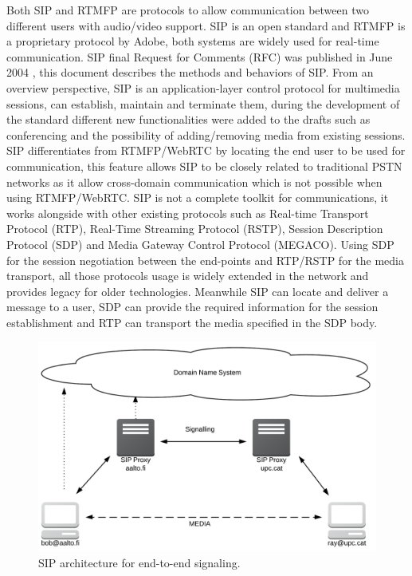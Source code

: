 Both SIP and RTMFP are protocols to allow communication between two different users with audio/video support. SIP is an open standard and RTMFP is a proprietary protocol by Adobe, both systems are widely used for real-time communication. SIP final Request for Comments (RFC) was published in June 2004 \cite{sipRFC}, this document describes the methods and behaviors of SIP. From an overview perspective, SIP is an application-layer control protocol for multimedia sessions, can establish, maintain and terminate them, during the development of the standard different new functionalities were added to the drafts such as conferencing and the possibility of adding/removing media from existing sessions. SIP differentiates from RTMFP/WebRTC by locating the end user to be used for communication, this feature allows SIP to be closely related to traditional PSTN networks as it allow cross-domain communication which is not possible when using RTMFP/WebRTC. SIP is not a complete toolkit for communications, it works alongside with other existing protocols such as Real-time Transport Protocol (RTP), Real-Time Streaming Protocol (RSTP), Session Description Protocol (SDP) and Media Gateway Control Protocol (MEGACO). Using SDP for the session negotiation between the end-points and RTP/RSTP for the media transport, all those protocols usage is widely extended in the network and provides legacy for older technologies. Meanwhile SIP can locate and deliver a message to a user, SDP can provide the required information for the session establishment and RTP can transport the media specified in the SDP body.

\begin{figure}[h]
  \centering
    \includegraphics[width=1\textwidth]{./figures/SIParchitecture.png}
      \caption[SIP architecture for end-to-end signaling]{SIP architecture for end-to-end signaling.}
	\label{fig:SIParchitecture}
\end{figure}

